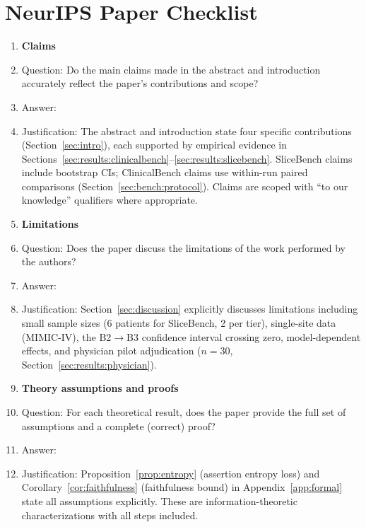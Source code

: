 
\section*{NeurIPS Paper Checklist}

\begin{enumerate}

\item {\bf Claims}
    \item[] Question: Do the main claims made in the abstract and introduction accurately reflect the paper's contributions and scope?
    \item[] Answer: \answerYes{}
    \item[] Justification: The abstract and introduction state four specific contributions (Section~\ref{sec:intro}), each supported by empirical evidence in Sections~\ref{sec:results:clinicalbench}--\ref{sec:results:slicebench}. SliceBench claims include bootstrap CIs; ClinicalBench claims use within-run paired comparisons (Section~\ref{sec:bench:protocol}). Claims are scoped with ``to our knowledge'' qualifiers where appropriate.

\item {\bf Limitations}
    \item[] Question: Does the paper discuss the limitations of the work performed by the authors?
    \item[] Answer: \answerYes{}
    \item[] Justification: Section~\ref{sec:discussion} explicitly discusses limitations including small sample sizes (6 patients for SliceBench, 2 per tier), single-site data (MIMIC-IV), the B2$\rightarrow$B3 confidence interval crossing zero, model-dependent effects, and physician pilot adjudication ($n=30$, Section~\ref{sec:results:physician}).

\item {\bf Theory assumptions and proofs}
    \item[] Question: For each theoretical result, does the paper provide the full set of assumptions and a complete (correct) proof?
    \item[] Answer: \answerYes{}
    \item[] Justification: Proposition~\ref{prop:entropy} (assertion entropy loss) and Corollary~\ref{cor:faithfulness} (faithfulness bound) in Appendix~\ref{app:formal} state all assumptions explicitly. These are information-theoretic characterizations with all steps included.


\end{enumerate}
